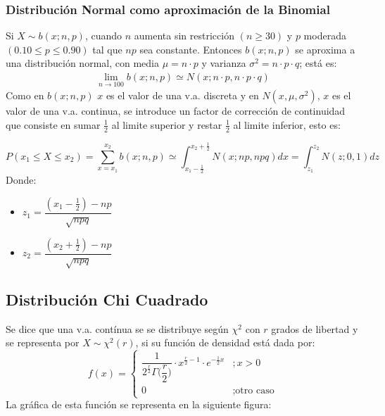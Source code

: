 \subsubsection{Distribución Normal como aproximación de la Binomial}
Si $X\sim b(x;n,p)$, cuando $n$ aumenta sin restricción $(n\geq 30)$ y $p$ moderada $(0.10 \leq p \leq 0.90)$ tal que $np$ sea constante. Entonces $b(x;n,p)$ se aproxima a una distribución normal, con media $\mu = n\cdot p$ y varianza $\sigma^2 = n\cdot p \cdot q$; está es:
\begin{align*}
\displaystyle\lim_{n\rightarrow 100} b(x;n,p) \simeq N(x;n\cdot p,n\cdot p \cdot q)
\end{align*}
Como en $b(x;n,p)$ $x$ es el valor de una v.a. discreta y en $N(x,\mu,\sigma^2)$, $x$ es el valor de una v.a. continua, se introduce un factor de corrección de continuidad que consiste en sumar $\frac{1}{2}$ al limite superior y restar $\frac{1}{2}$ al limite inferior, esto es:

$$
P(x_1\leq X\leq x_2)=\displaystyle\sum_{x=x_1}^{x_2} b(x;n,p)\simeq\displaystyle\int_{x_1-\frac{1}{2}}^{x_2+\frac{1}{2}} N(x;np,npq) dx = \displaystyle\int_{z_1}^{z_2} N(z;0,1) dz
$$
Donde:
\begin{itemize}
\item $z_1=\dfrac{(x_1-\frac{1}{2})-np}{\sqrt{npq}}$
\item $z_2=\dfrac{(x_2+\frac{1}{2})-np}{\sqrt{npq}}$
\end{itemize}

\subsection{Distribución Chi Cuadrado}
Se dice que una v.a. contínua se se distribuye según $\chi^2$ con $r$ grados de libertad y se representa por $X\sim\chi^2(r)$, si su función de densidad está dada por:
$$
f(x)=
\begin{cases}
\dfrac{1}{2^{\frac{r}{2}}\Gamma\Big( \dfrac{r}{2} \Big)}\cdot x^{\frac{r}{2}-1} \cdot e^{-\frac{1}{2}x} &; x>0 \\
0 &; \text{otro caso}
\end{cases}
$$
La gráfica de esta función se representa en la siguiente figura:



